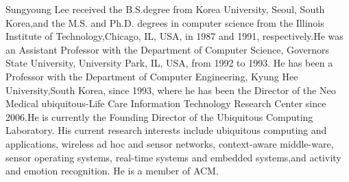 \documentclass{ieeeaccess}
\begin{document}
\begin{IEEEbiography}{Sungyoung Lee} received the B.S.degree from Korea University, Seoul, South Korea,and the M.S. and Ph.D. degrees in computer science from the Illinois Institute of Technology,Chicago, IL, USA, in 1987 and 1991, respectively.He was an Assistant Professor with the Department of Computer Science, Governors State University, University Park, IL, USA, from 1992 to 1993. He has been a Professor with the Department of Computer Engineering, Kyung Hee University,South Korea, since 1993, where he has been the Director of the Neo Medical ubiquitous-Life Care Information Technology Research Center since 2006.He is currently the Founding Director of the Ubiquitous Computing Laboratory. His current research interests include ubiquitous computing and applications, wireless ad hoc and sensor networks, context-aware middle-ware, sensor operating systems, real-time systems and embedded systems,and activity and emotion recognition. He is a member of ACM.
\end{IEEEbiography}

\EOD
\end{document}
